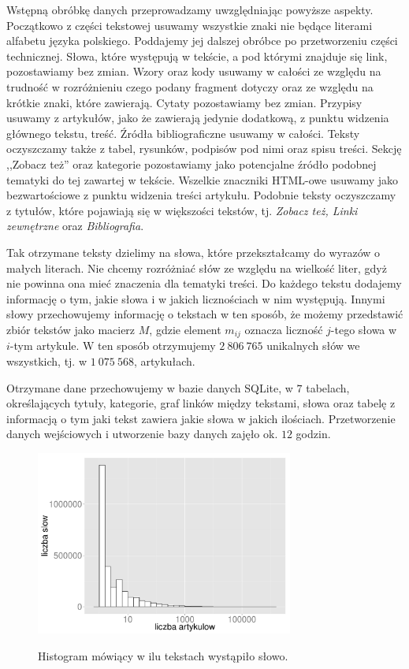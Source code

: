 \documentclass{praca1}
\begin{document}
Wstępną obróbkę danych przeprowadzamy uwzględniając powyższe aspekty. Początkowo z części tekstowej usuwamy wszystkie znaki nie będące literami alfabetu języka polskiego. Poddajemy jej dalszej obróbce po przetworzeniu części technicznej. Słowa, które występują w tekście, a pod którymi znajduje się link, pozostawiamy bez zmian. Wzory oraz kody usuwamy w całości ze względu na trudność w rozróżnieniu czego podany fragment dotyczy oraz ze względu na krótkie znaki, które zawierają. Cytaty pozostawiamy bez zmian. Przypisy usuwamy z artykułów, jako że zawierają jedynie dodatkową, z punktu widzenia głównego tekstu, treść. Źródła bibliograficzne usuwamy w całości. Teksty oczyszczamy także z tabel, rysunków, podpisów pod nimi oraz spisu treści. Sekcję ,,Zobacz też'' oraz kategorie pozostawiamy jako potencjalne źródło podobnej tematyki do tej zawartej w tekście. Wszelkie znaczniki HTML-owe usuwamy jako bezwartościowe z punktu widzenia treści artykułu. Podobnie teksty oczyszczamy z tytułów, które pojawiają się w większości tekstów, tj. \emph{Zobacz też, Linki zewnętrzne} oraz \emph{Bibliografia}. 

Tak otrzymane teksty dzielimy na słowa, które przekształcamy do wyrazów o małych literach. Nie chcemy rozróżniać słów ze względu na wielkość liter, gdyż nie powinna ona mieć znaczenia dla tematyki treści. Do każdego tekstu dodajemy informację o tym, jakie słowa i w jakich licznościach w nim występują. Innymi słowy przechowujemy informację o tekstach w ten sposób, że możemy przedstawić zbiór tekstów jako macierz $M$, gdzie element $m_{ij}$ oznacza liczność $j$-tego słowa w $i$-tym artykule. W ten sposób otrzymujemy $2\ 806\ 765$ unikalnych słów we wszystkich, tj. w $1\ 075\ 568$, artykułach. 

Otrzymane dane przechowujemy w bazie danych SQLite, w $7$ tabelach, określających tytuły, kategorie, graf linków między tekstami, słowa oraz tabelę z informacją o tym jaki tekst zawiera jakie słowa w jakich ilościach. Przetworzenie danych wejściowych i utworzenie bazy danych zajęło ok. $12$ godzin.

\begin{figure}[!h]
  \centering
  \includegraphics[width=240pt]{plot1.pdf}\\
  \caption{Histogram mówiący w ilu tekstach wystąpiło słowo.}\label{plot:001}
\end{figure}
\end{document}
